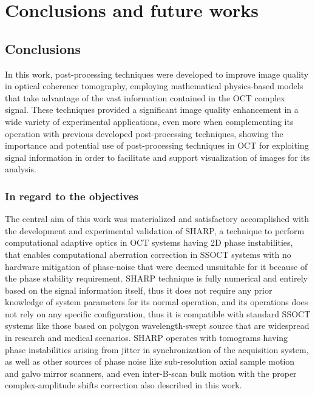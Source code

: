 \newpage
{}
\chapter{Conclusions and future works}\label{chap:conclusions}

\section{Conclusions}

In this work, post-processing techniques were developed to improve image quality in optical coherence tomography, employing mathematical physics-based models that take advantage of the vast information contained in the OCT complex signal. These techniques provided a significant image quality enhancement in a wide variety of experimental applications, even more when complementing its operation with previous developed post-processing techniques, showing the importance and potential use of post-processing techniques in OCT for exploiting signal information in order to facilitate and support visualization of images for its analysis.

\subsection{In regard to the objectives}

The central aim of this work was materialized and satisfactory accomplished with the development and experimental validation of SHARP, a technique to perform computational adaptive optics in OCT systems having 2D phase instabilities, that enables computational aberration correction  in SSOCT systems with no hardware mitigation of phase-noise that were deemed unsuitable for it because of the phase stability requirement. SHARP technique is fully numerical and entirely based on the signal information itself, thus it does not require any prior knowledge of system parameters for its normal operation, and its operations does not rely on any specific configuration, thus it is compatible with standard SSOCT systems like those based on polygon wavelength-swept source that are widespread in research and medical scenarios. SHARP operates with tomograms having phase instabilities arising from jitter in synchronization of the acquisition system, as well as other sources of phase noise like sub-resolution axial sample motion and galvo mirror scanners, and even inter-B-scan bulk motion with the proper complex-amplitude shifts correction also described in this work.

